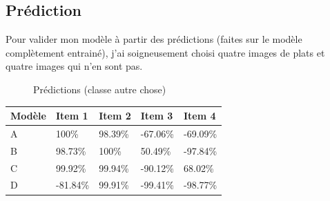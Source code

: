 \documentclass[a4paper,12pt]{report}
\begin{document}
      \subsection{Prédiction}
      Pour valider mon modèle à partir des prédictions (faites sur le modèle complètement entrainé), j'ai soigneusement choisi quatre images de plats et quatre images qui n'en sont pas.
      \medbreak
      \begin{figure}[!h]%
        \centering
        \qquad
        \qquad
        \qquad
        \caption{Prédictions (classe autre chose)}%
      \end{figure}%
      \FloatBarrier
      \bigbreak

      \begin{table}[!h]
      \centering
        \begin{tabular}{lllll}
          \hline
          Modèle & Item 1 & Item 2 & Item 3 & Item 4 \\
          \hline
          A & 100\% & 98.39\% & -67.06\% & -69.09\% \\
          B & 98.73\% & 100\% & 50.49\% & -97.84\% \\
          C & 99.92\% & 99.94\% & -90.12\% & 68.02\% \\
          D & -81.84\% & 99.91\% & -99.41\% & -98.77\% \\
          \hline
        \end{tabular}
      \end{table}
      \smallbreak
\end{document}
